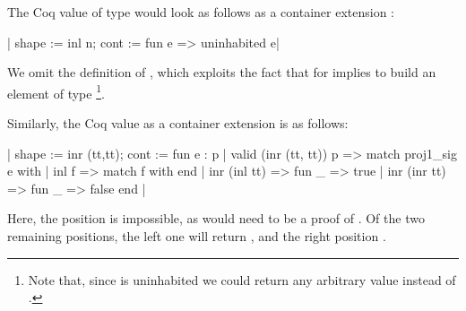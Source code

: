\documentclass[anonymous, a4paper, UKenglish, cleveref, autoref, thm-restate]{lipics-v2021}
\begin{document}
The Coq value  of type
 would look as follows as a container
extension
:
\begin{coqcode}
{| shape := inl n; cont := fun e => uninhabited e|}
\end{coqcode}
We omit the definition of , which exploits the
fact that  for  implies
 to build an element of type %
\footnote{Note that, since  is uninhabited we could return
any arbitrary value instead of .}.

Similarly, the Coq value  as a container
extension is as follows:
\begin{coqcode}
  {| shape := inr (tt,tt);
     cont := fun e : {p | valid (inr (tt, tt)) p} =>
        match proj1_sig e with
        | inl f => match f with end
        | inr (inl tt) => fun _ => true
        | inr (inr tt) => fun _ => false
        end
  |}
\end{coqcode}
Here, the position  is impossible, as
 would need to be a proof of .
Of the two remaining positions, the left one will return
, and the right position .
\end{document}
